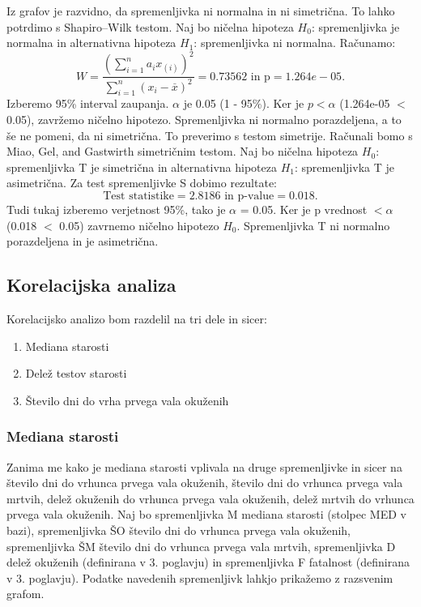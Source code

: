 \documentclass[a4paper,11pt]{article}
\begin{document}
Iz grafov je razvidno, da spremenljivka ni normalna in ni simetrična. To lahko potrdimo s Shapiro–Wilk testom. Naj bo ničelna hipoteza \(H_0\): spremenljivka je normalna in alternativna hipoteza \(H_1\): spremenljivka ni normalna. Računamo:
\[W = \frac{(\sum_{i = 1}^{n}a_i x_{(i)})^2}{\sum_{i = 1}^{n}(x_i - \overset{\_}{x})^2} = 0.73562 \text{ in p} = 1.264e-05. \]
Izberemo 95\% interval zaupanja. \(\alpha\) je 0.05 (1 - 95\%). Ker je \(p < \alpha\) (1.264e-05 \(<\) 0.05), zavržemo ničelno hipotezo. Spremenljivka ni normalno porazdeljena, a to še ne pomeni, da ni simetrična. To preverimo s testom simetrije. Računali bomo s Miao, Gel, and Gastwirth simetričnim testom. Naj bo ničelna hipoteza \(H_0\): spremenljivka T je simetrična in alternativna hipoteza \(H_1\): spremenljivka T je asimetrična. Za test spremenljivke S dobimo rezultate:
\[\text{Test statistike} = 2.8186 \text{ in p-value} =  0.018.\]
Tudi tukaj izberemo verjetnost 95\%, tako je \(\alpha\) = 0.05. Ker je p vrednost \(< \alpha\) (0.018 \(<\) 0.05) zavrnemo ničelno hipotezo \(H_0\). Spremenljivka T ni normalno porazdeljena in je asimetrična.

\subsection{Korelacijska analiza}
Korelacijsko analizo bom razdelil na tri dele in sicer:
\begin{enumerate}
\item{Mediana starosti}
\item{Delež testov starosti}
\item{Število dni do vrha prvega vala okuženih}
\end{enumerate}

\subsubsection{Mediana starosti}
Zanima me kako je mediana starosti vplivala na druge spremenljivke in sicer na število dni do vrhunca prvega vala okuženih, število dni do vrhunca prvega vala mrtvih, delež okuženih do vrhunca prvega vala okuženih, delež mrtvih do vrhunca prvega vala okuženih. Naj bo spremenljivka M mediana starosti (stolpec MED v bazi), spremenljivka ŠO število dni do vrhunca prvega vala okuženih, spremenljivka ŠM število dni do vrhunca prvega vala mrtvih, spremenljivka D delež okuženih (definirana v 3. poglavju) in spremenljivka F fatalnost (definirana v 3. poglavju). Podatke navedenih spremenljivk lahkjo prikažemo z razsvenim grafom.
\end{document}
